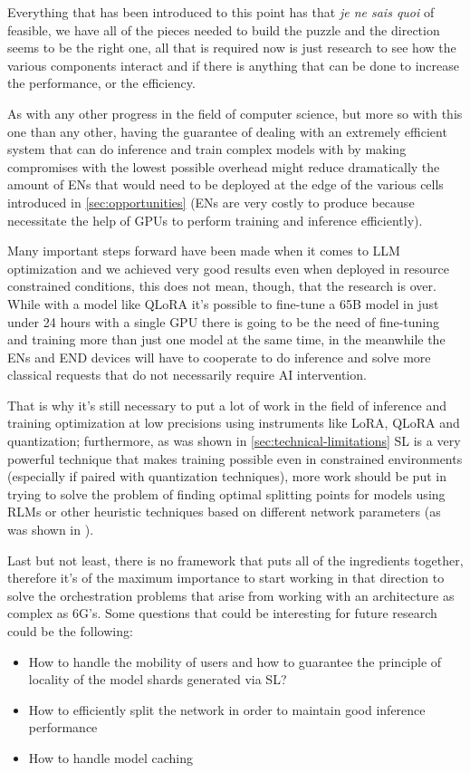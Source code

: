 
Everything that has been introduced to this point has that \textit{je ne sais quoi} of feasible, we
have all of the pieces needed to build the puzzle and the direction seems to be the right one, all
that is required now is just research to see how the various components interact and if there is
anything that can be done to increase the performance, or the efficiency.

As with any other progress in the field of computer science, but more so with this one than any
other, having the guarantee of dealing with an extremely efficient system that can do inference and
train complex models with by making compromises with the lowest possible overhead might reduce
dramatically the amount of ENs that would need to be deployed at the edge of the various cells
introduced in \ref{sec:opportunities} (ENs are very costly to produce because necessitate the help of GPUs to perform
training and inference efficiently).

Many important steps forward have been made when it comes to LLM optimization and we achieved very
good results even when deployed in resource constrained conditions, this does not mean, though, that
the research is over. While with a model like QLoRA it's possible to fine-tune a 65B model in just
under 24 hours with a single GPU there is going to be the need of fine-tuning and training more than
just one model at the same time, in the meanwhile the ENs and END devices
will have to cooperate to do inference and solve more classical requests that do not necessarily require AI
intervention.

That is why it's still necessary to put a lot of work in the field of inference and training
optimization at low precisions using instruments like LoRA, QLoRA and quantization; furthermore, as
was shown in \ref{sec:technical-limitations} SL is a very powerful technique that makes training possible even in constrained
environments (especially if paired with quantization techniques), more work should be put in trying
to solve the problem of finding optimal splitting points for models using RLMs or other heuristic
techniques based on different network parameters (as was shown in \cite{rlm-split-learning}).

Last but not least, there is no framework that puts all of the ingredients together, therefore it's
of the maximum importance to start working in that direction to solve the orchestration problems
that arise from working with an architecture as complex as 6G's. Some questions that could be
interesting for future research could be the following:
\begin{itemize}
	\item How to handle the mobility of users and how to guarantee the principle of locality of
	      the model shards generated via SL?
	\item How to efficiently split the network in order to maintain good inference performance
	\item How to handle model caching
\end{itemize}
